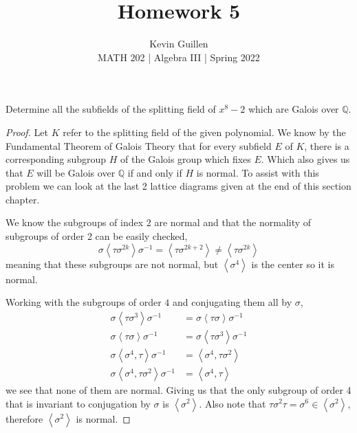 \documentclass[11pt]{article}
\newenvironment{problem}[2][Problem\!]{\begin{tcolorbox}\begin{trivlist}
\item[\hskip \labelsep {\bfseries #1}\hskip \labelsep {\bfseries #2}]}{\end{trivlist}\end{tcolorbox}}
\newcommand{\qq}{\mathbb Q}   %
\begin{document}
 
\title{Homework 5}
\author{Kevin Guillen\\[0.5em]
MATH 202  | Algebra III | Spring 2022}
\date{} 
\maketitle


\begin{problem}{14.2.7}
    Determine all the subfields of the splitting field of $x^{8} - 2$ which are Galois over $\qq$.
\end{problem}
\begin{proof}
    Let $K$ refer to the splitting field of the given polynomial. We know by the Fundamental Theorem of Galois Theory that for every subfield $E$ of $K$, there is a corresponding subgroup $H$ of the Galois group which fixes $E$. Which also gives us that $E$ will be Galois over $\qq$ if and only if $H$ is normal. To assist with this problem we can look at the last 2 lattice diagrams given at the end of this section chapter. 

    We know the subgroups of index 2 are normal and that the normality of subgroups of order 2 can be easily checked,
    \[\sigma \left<\tau\sigma^{2k} \right>\sigma^{-1} = \left<\tau\sigma^{2k + 2}\right> \neq \left<\tau\sigma^{2k} \right>\]
    meaning that these subgroups are not normal, but $\left<\sigma^{4}\right> $ is the center so it is normal. 

    Working with the subgroups of order $4$ and conjugating them all by $\sigma$,
    \begin{align*}
        \sigma \left<\tau \sigma^{3}\right>\sigma^{-1} &= \sigma \left<\tau \sigma\right>\sigma^{-1} \\
        \sigma\left<\tau \sigma\right>\sigma^{-1} &= \sigma\left<\tau \sigma^{3}\right>\sigma^{-1} \\
        \sigma\left<\sigma^{4}, \tau\right>\sigma^{-1} &= \left< \sigma^{4}, \tau \sigma^{2} \right>\\
        \sigma\left<\sigma^{4}, \tau\sigma^{2}\right>\sigma^{-1} &=\left<\sigma^{4},\tau \right> 
    \end{align*}
    we see that none of them are normal. Giving us that the only subgroup of order 4 that is invariant to conjugation by $\sigma$ is $\left<\sigma^{2} \right>$. Also note that $\tau \sigma^{2}\tau = \sigma^{6} \in \left< \sigma^{2}\right>$, therefore $\left< \sigma^{2}\right>$ is normal. 


\end{proof}
\end{document}
